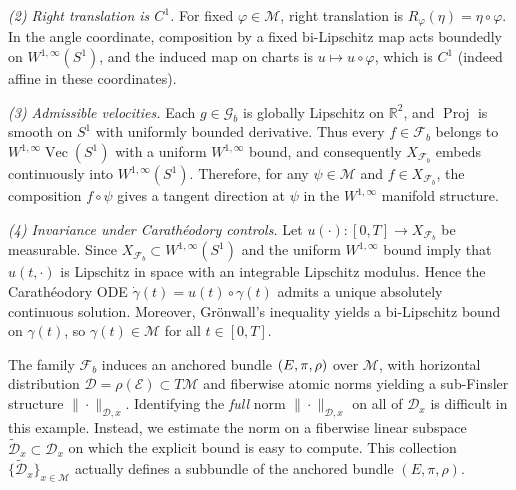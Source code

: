 \documentclass[12pt]{amsart}
\numberwithin{equation}{section}
\theoremstyle{remark}
\begin{document}
\emph{(2) Right translation is $C^1$.}
For fixed $\varphi\in\mathcal M$, right translation is $R_\varphi(\eta)=\eta\circ\varphi$.
In the angle coordinate, composition by a fixed bi-Lipschitz map acts boundedly on $W^{1,\infty}(S^1)$, and the induced map on charts is
$u\mapsto u\circ\varphi$, which is $C^1$ (indeed affine in these coordinates).

\emph{(3) Admissible velocities.}
Each $g\in\mathcal G_b$ is globally Lipschitz on $\mathbb R^2$,
and $\operatorname{Proj}$ is smooth on $S^1$ with uniformly bounded derivative. Thus every $f\in\mathcal F_b$ belongs to
$W^{1,\infty}\operatorname{Vec}(S^1)$ with a uniform $W^{1,\infty}$ bound, and consequently $X_{\mathcal F_b}$
embeds continuously into $W^{1,\infty}(S^1)$. Therefore, for any $\psi\in\mathcal M$ and $f\in X_{\mathcal F_b}$,
the composition $f\circ\psi$ gives a tangent direction at $\psi$ in the $W^{1,\infty}$ manifold structure.

\emph{(4) Invariance under Carath\'eodory controls.}
Let $u(\cdot):[0,T]\to X_{\mathcal F_b}$ be measurable. Since $X_{\mathcal F_b}\subset W^{1,\infty}(S^1)$
and the uniform $W^{1,\infty}$ bound imply that $u(t,\cdot)$ is Lipschitz in space with an integrable Lipschitz modulus.
Hence the Carath\'eodory ODE $\dot\gamma(t)=u(t)\circ\gamma(t)$ admits a unique absolutely continuous solution.
Moreover, Gr\"onwall's inequality yields a bi-Lipschitz bound on $\gamma(t)$, so $\gamma(t)\in\mathcal M$
for all $t\in[0,T]$.

\medskip
The family \(\mathcal F_b\) induces an anchored bundle \((\mathcal \mathcal E,\pi,\rho)\) over \(\mathcal M\), with horizontal distribution \(\mathcal D=\rho(\mathcal E)\subset T\mathcal M\) and fiberwise atomic norms yielding a sub-Finsler structure \(\|\cdot\|_{\mathcal D,x}\).
Identifying the \emph{full} norm \(\|\cdot\|_{\mathcal D,x}\) on all of \(\mathcal D_x\) is difficult in this example.
Instead, we estimate the norm on a fiberwise linear subspace \(\widetilde{\mathcal D}_x\subset \mathcal D_x\) on which the explicit bound is easy to compute. This collection \(\{\widetilde{\mathcal D}_x\}_{x\in\mathcal M}\) actually defines a subbundle of the anchored bundle \((E,\pi,\rho)\).
\end{document}
